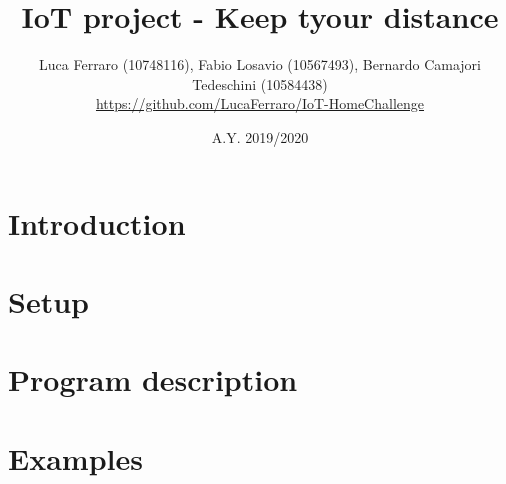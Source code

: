 \documentclass{article} %
\title{\textbf{\huge{IoT project - Keep tyour distance}}}
\author{Luca Ferraro (10748116), Fabio Losavio (10567493), Bernardo Camajori Tedeschini (10584438)  \\ 
\textcolor{url_blue}{\url{https://github.com/LucaFerraro/IoT-HomeChallenge}}}
\date{A.Y. 2019/2020}
\begin{document}

\begin{titlingpage}
    \maketitle
\end{titlingpage}

\newpage{}

\tableofcontents
\listoffigures
\lstlistoflistings
\newpage{}

\clearpage
\section{Introduction}
\label{sect:introduction}



\clearpage
\section{Setup}
\label{sect:project}



\clearpage
\section{Program description}
\label{sect:project}


\clearpage
\section{Examples}
\label{sect:project}


\end{document}
